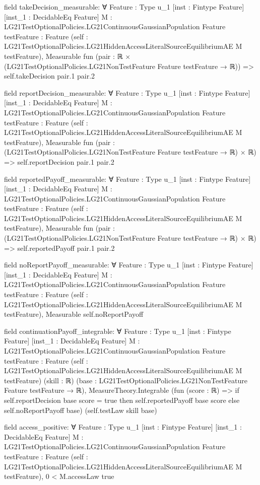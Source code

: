 \documentclass[10pt]{article}
\begin{document}
\begin{ReviewVerbatim}
field takeDecision_measurable:
∀ {Feature : Type u_1} [inst : Fintype Feature] [inst_1 : DecidableEq Feature]
  {M : LG21TestOptionalPolicies.LG21ContinuousGaussianPopulation Feature} {testFeature : Feature}
  (self : LG21TestOptionalPolicies.LG21HiddenAccessLiteralSourceEquilibriumAE M testFeature),
  Measurable fun (pair : ℝ × (LG21TestOptionalPolicies.LG21NonTestFeature Feature testFeature → ℝ)) =>
    self.takeDecision pair.1 pair.2

field reportDecision_measurable:
∀ {Feature : Type u_1} [inst : Fintype Feature] [inst_1 : DecidableEq Feature]
  {M : LG21TestOptionalPolicies.LG21ContinuousGaussianPopulation Feature} {testFeature : Feature}
  (self : LG21TestOptionalPolicies.LG21HiddenAccessLiteralSourceEquilibriumAE M testFeature),
  Measurable fun (pair : (LG21TestOptionalPolicies.LG21NonTestFeature Feature testFeature → ℝ) × ℝ) =>
    self.reportDecision pair.1 pair.2

field reportedPayoff_measurable:
∀ {Feature : Type u_1} [inst : Fintype Feature] [inst_1 : DecidableEq Feature]
  {M : LG21TestOptionalPolicies.LG21ContinuousGaussianPopulation Feature} {testFeature : Feature}
  (self : LG21TestOptionalPolicies.LG21HiddenAccessLiteralSourceEquilibriumAE M testFeature),
  Measurable fun (pair : (LG21TestOptionalPolicies.LG21NonTestFeature Feature testFeature → ℝ) × ℝ) =>
    self.reportedPayoff pair.1 pair.2

field noReportPayoff_measurable:
∀ {Feature : Type u_1} [inst : Fintype Feature] [inst_1 : DecidableEq Feature]
  {M : LG21TestOptionalPolicies.LG21ContinuousGaussianPopulation Feature} {testFeature : Feature}
  (self : LG21TestOptionalPolicies.LG21HiddenAccessLiteralSourceEquilibriumAE M testFeature),
  Measurable self.noReportPayoff

field continuationPayoff_integrable:
∀ {Feature : Type u_1} [inst : Fintype Feature] [inst_1 : DecidableEq Feature]
  {M : LG21TestOptionalPolicies.LG21ContinuousGaussianPopulation Feature} {testFeature : Feature}
  (self : LG21TestOptionalPolicies.LG21HiddenAccessLiteralSourceEquilibriumAE M testFeature) (skill : ℝ)
  (base : LG21TestOptionalPolicies.LG21NonTestFeature Feature testFeature → ℝ),
  MeasureTheory.Integrable
    (fun (score : ℝ) =>
      if self.reportDecision base score = true then self.reportedPayoff base score else self.noReportPayoff base)
    (self.testLaw skill base)

field access_positive:
∀ {Feature : Type u_1} [inst : Fintype Feature] [inst_1 : DecidableEq Feature]
  {M : LG21TestOptionalPolicies.LG21ContinuousGaussianPopulation Feature} {testFeature : Feature}
  (self : LG21TestOptionalPolicies.LG21HiddenAccessLiteralSourceEquilibriumAE M testFeature), 0 < M.accessLaw {true}


\end{ReviewVerbatim}
\end{document}
